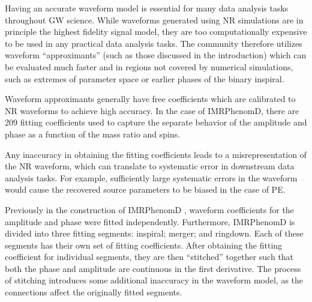 \documentclass[twocolumn]{aastex631}
\newcommand{\AZ}[1]{{\color{Burnt}[AZ: #1]}}
\newcommand{\amc}[1]{{\color{red}[AC: #1]}}
\begin{document}

Having an accurate waveform model is essential for many data analysis tasks throughout
GW science.
While waveforms generated using NR simulations are in principle the highest fidelity signal model, they are too computationally expensive to be used in any practical data analysis tasks.
The community therefore utilizes waveform ``approximants'' (such as those discussed in the introduction) which can be evaluated much faster and in regions not covered by numerical simulations, such as extremes of parameter space or earlier phases of the binary inspiral.

Waveform approximants generally have free coefficients which are calibrated
to NR waveforms to achieve high accuracy.
In the case of IMRPhenomD, there are 209 fitting coefficients used to capture the separate behavior of the amplitude and phase as a function of the mass ratio and spins.

Any inaccuracy in obtaining the fitting coefficients
leads to a misrepresentation of the NR waveform, which can translate to systematic
error in downstream data analysis tasks. For example, sufficiently large
systematic errors in the waveform would cause the recovered source parameters to be biased
in the case of PE.

Previously in the construction of IMRPhenomD \citep{Khan:2015jqa}, waveform
coefficients for the amplitude and phase were fitted independently.
Furthermore, IMRPhenomD is divided into three fitting segments: inspiral; merger; and ringdown.
Each of these segments has their own set of fitting coefficients.
After obtaining the fitting coefficient for individual segments, they are then ``stitched'' together such that both the phase and amplitude are continuous in the first derivative.
The process of stitching introduces some additional inaccuracy in the waveform model, as the connections affect the originally fitted segments.
\end{document}
